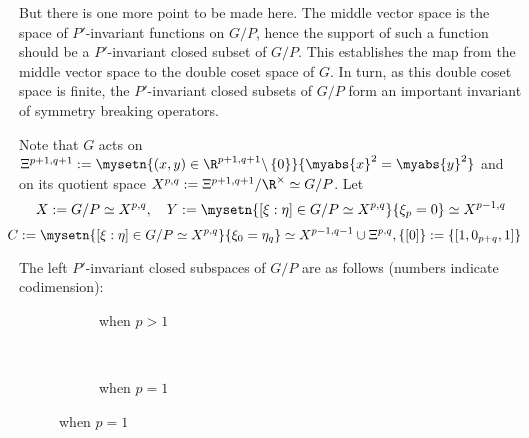 \documentclass[pdf]{beamer}
\renewcommand{\setminus}{\backslash}
\theoremstyle{mystyle}
\theoremstyle{remark}
\begin{document}
\begin{frame}
\begin{fact}
{	But there is one more point to be made here.
	The middle vector space is the space of $P'$-invariant functions on $G/P$, hence the support of such a function should be a $P'$-invariant
	closed subset of $G/P$. This establishes the map from the middle vector space to the double coset space of $G$. In turn, as this double coset space
	is finite, the $P'$-invariant closed subsets of $G/P$ form an important invariant of symmetry breaking operators.
}
\end{fact}
\end{frame}
\begin{frame}
Note that $G$ acts on $\Xi^{p+1,q+1}:=\mysetn{(x,y)\in\R^{p+1,q+1}\setminus\left\{ 0 \right\}}{\myabs{x}^2=\myabs{y}^2}$ and on its quotient space
$X^{p,q}:=\Xi^{p+1,q+1}/\R^{\times}\simeq G/P$. Let
\[
	X:=G/P\simeq X^{p,q},\quad Y:=\mysetn{[\xi:\eta]\in G/P\simeq X^{p,q}}{\xi_{p}=0}\simeq X^{p-1,q}\]
	\[\kern-0.32cm C:=\mysetn{[\xi:\eta]\in G/P\simeq X^{p,q}}{\xi_{0}=\eta_q}\simeq X^{p-1,q-1}\cup\Xi^{p,q},\left\{ [0] \right\}:=\left\{ [1,0_{p+q},1] \right\}\]
\begin{theorem}
	The left $P'$-invariant closed subspaces of $G/P$ are as follows (numbers indicate codimension):\\
	\vspace{-1em}
  \begin{figure}[H]
    \centering
    \begin{subfigure}[t]{0.3\textwidth}
	    \xymatrixrowsep{0.5pc}
	\caption{when $p>1$}
    \end{subfigure}
    ~ %
    \begin{subfigure}[t]{0.3\textwidth}
	    \xymatrixrowsep{0.5pc}
	    {}
	    \vspace{0.6em}
	\caption{when $p=1$}
    \end{subfigure}

\end{figure}
\end{theorem}
\end{frame}
\end{document}
